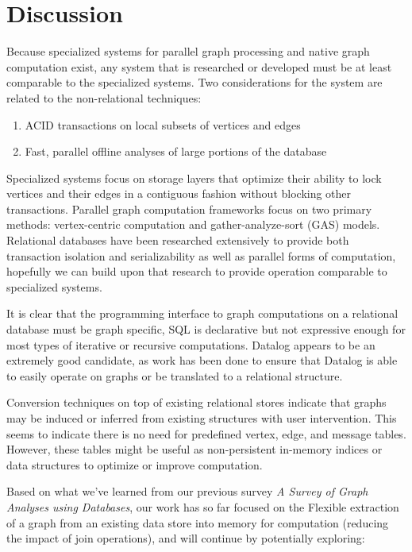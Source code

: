\documentclass[11pt,letterpaper]{article}
\begin{document}
\section*{Discussion}

Because specialized systems for parallel graph processing and native graph computation exist, any system that is researched or developed must be at least comparable to the specialized systems. Two considerations for the system are related to the non-relational techniques:

\begin{enumerate}
	\item ACID transactions on local subsets of vertices and edges
	\item Fast, parallel offline analyses of large portions of the database
\end{enumerate}

Specialized systems focus on storage layers that optimize their ability to lock vertices and their edges in a contiguous fashion without blocking other transactions. Parallel graph computation frameworks focus on two primary methods: vertex-centric computation and gather-analyze-sort (GAS) models. Relational databases have been researched extensively to provide both transaction isolation and serializability as well as parallel forms of computation, hopefully we can build upon that research to provide operation comparable to specialized systems.

It is clear that the programming interface to graph computations on a relational database must be graph specific, SQL is declarative but not expressive enough for most types of iterative or recursive computations. Datalog appears to be an extremely good candidate, as work has been done to ensure that Datalog is able to easily operate on graphs or be translated to a relational structure.

Conversion techniques on top of existing relational stores indicate that graphs may be induced or inferred from existing structures with user intervention. This seems to indicate there is no need for predefined vertex, edge, and message tables. However, these tables might be useful as non-persistent in-memory indices or data structures to optimize or improve computation.

Based on what we've learned from our previous survey \textit{A Survey of Graph Analyses using Databases}, our work has so far focused on the Flexible extraction of a graph from an existing data store into memory for computation (reducing the impact of join operations), and will continue by potentially exploring:
\end{document}
